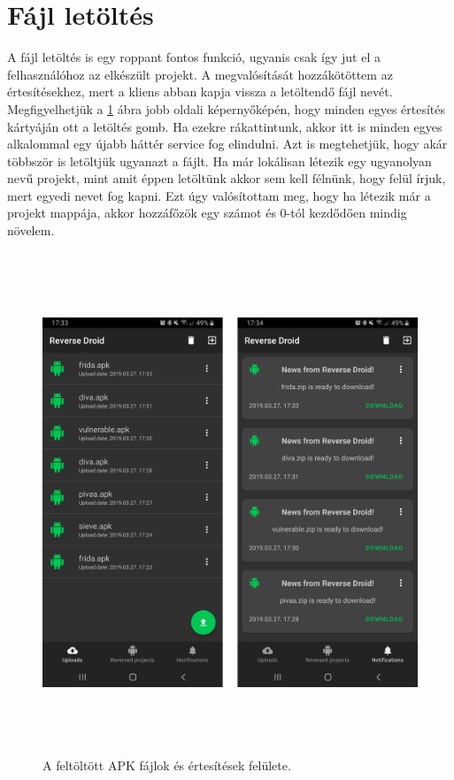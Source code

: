 \documentclass{thesis-ekf}
\theoremstyle{definition}
\theoremstyle{remark}
\begin{document}
\section{Fájl letöltés}

A fájl letöltés is egy roppant fontos funkció, ugyanis csak így jut el a felhasználóhoz az elkészült projekt.
A megvalósítását hozzákötöttem az értesítésekhez, mert a kliens abban kapja vissza a letöltendő fájl nevét.
Megfigyelhetjük a \ref{uploads_notifications} ábra jobb oldali képernyőképén, hogy minden egyes értesítés kártyáján ott a letöltés gomb.
Ha ezekre rákattintunk, akkor itt is minden egyes alkalommal egy újabb háttér service fog elindulni.
Azt is megtehetjük, hogy akár többször is letöltjük ugyanazt a fájlt.
Ha már lokálisan létezik egy ugyanolyan nevű projekt, mint amit éppen letöltünk akkor sem kell félnünk, hogy felül írjuk, mert egyedi nevet fog kapni.
Ezt úgy valósítottam meg, hogy ha létezik már a projekt mappája, akkor hozzáfőzök egy számot és 0-tól kezdődően mindig növelem.

\begin{figure}[!h]
	\centering
	\includegraphics[height=15cm]{pictures/android_uploads_notifications}
	\caption{A feltöltött APK fájlok és értesítések felülete.}
	\label{uploads_notifications}
\end{figure}
\end{document}
